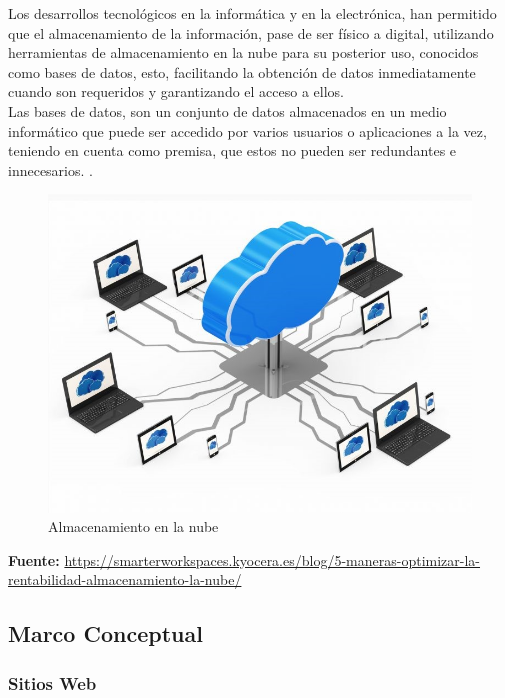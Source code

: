 		{Los desarrollos tecnológicos en la informática y en la electrónica, han permitido que el almacenamiento de la información, pase de ser físico a digital, utilizando herramientas de almacenamiento en la nube para su posterior uso, conocidos como bases de datos, esto, facilitando la obtención de datos inmediatamente cuando son requeridos y garantizando el acceso a ellos.\\
			
		Las bases de datos, son un conjunto de datos almacenados en un medio informático que puede ser accedido por varios usuarios o aplicaciones a la vez, teniendo en cuenta como premisa, que estos no pueden ser redundantes e innecesarios.  \cite{angelData}.\\
		
		\begin{figure}[H]
			\centering
			\includegraphics[width=0.8\linewidth]{description/framework/nube.jpg}
			\caption{Almacenamiento en la nube}
		\end{figure}
		\begin{center}
			\textbf{Fuente:} \url{https://smarterworkspaces.kyocera.es/blog/5-maneras-optimizar-la-rentabilidad-almacenamiento-la-nube/}
		\end{center}
	}
		
	
	\subsection{Marco Conceptual}
	
		\subsubsection{Sitios Web}
		
